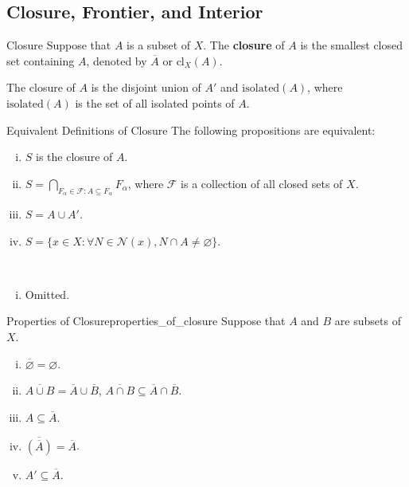 \documentclass{report}
\begin{document}
\subsection{Closure, Frontier, and Interior}

\begin{definition}{Closure}{}
	Suppose that $A$ is a subset of $X$. The \textbf{closure} of $A$ is the smallest closed set containing $A$, denoted by $\overline{A}$ or $\mathrm{cl}_X(A)$.
\end{definition}

The closure of $A$ is the disjoint union of $A'$ and $\mathrm{isolated}(A)$, where $\mathrm{isolated}(A)$ is the set of all isolated points of $A$.

\begin{proposition}{Equivalent Definitions of Closure}{}
	The following propositions are equivalent:
	\begin{enumerate}[(i)]
		\item $S$ is the closure of $A$.
		\item $S=\bigcap\limits_{F_\alpha\in\mathcal{F}:A\subseteq F_\alpha}F_\alpha$, where $\mathcal{F}$ is a collection of all closed sets of $X$.
		\item $S=A\cup A'$.
		\item $S=\{x\in X: \forall N\in\mathcal{N}(x),N\cap A\ne\varnothing\}$.
	\end{enumerate}
\end{proposition}


\begin{prf}~\\ \vspace{-1em}
	\begin{enumerate}[(i)]
		\item Omitted.
	\end{enumerate}
\end{prf}

\begin{proposition}{Properties of Closure}{properties_of_closure}
	Suppose that $A$ and $B$ are subsets of $X$.
	\begin{enumerate}[(i)]
		\item $\overline{\varnothing}=\varnothing$.
		\item $\overline{A \cup B}=\overline{A}\cup\overline{B}$,  $\overline{A \cap B}\subseteq \overline{A}\cap\overline{B}$.
		\item $A\subseteq \overline{A}$.
		\item $\overline{\left(\overline{A}\right)}=\overline{A}$.
		\item $A'\subseteq \overline{A}$.
	\end{enumerate}
\end{proposition}
\end{document}
